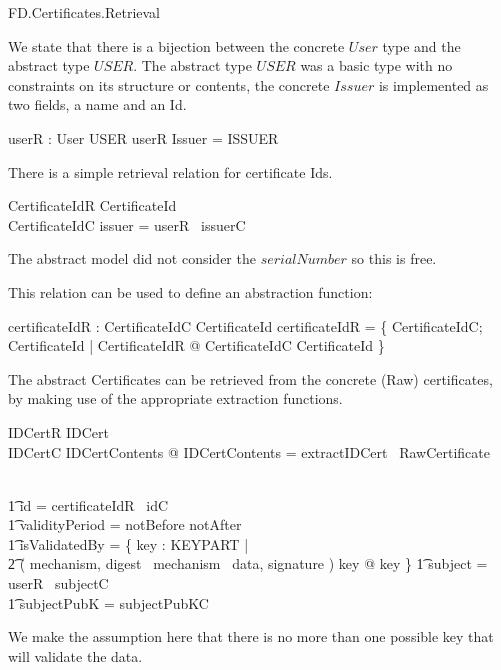 \begin{traceunit}{FD.Certificates.Retrieval}
\end{traceunit}

We state that there is a bijection between the concrete $User$ type
and the abstract type $USER$. The abstract type $USER$ was a basic
type with no constraints on its structure or contents, the concrete
$Issuer$ is implemented as two fields, a name and an Id.

\begin{axdef}
        userR : User \bij USER
\where
        userR \limg Issuer \rimg  = ISSUER
\end{axdef}


There is a simple retrieval relation for certificate Ids.

\begin{schema}{CertificateIdR}
        CertificateId
\\      CertificateIdC
\where
        issuer = userR~ issuerC
\end{schema}
\begin{Zcomment}
\item
The abstract model did not consider the $serialNumber$ so this is
free.
\end{Zcomment}

This relation can be used to define an abstraction function:

\begin{axdef}
        certificateIdR : CertificateIdC \fun
        CertificateId
\where
        certificateIdR = \{ CertificateIdC;
        CertificateId | CertificateIdR @ 
        \theta CertificateIdC \mapsto \theta CertificateId \} 
\end{axdef}

The abstract Certificates can be retrieved from the concrete (Raw)
certificates, by making use of the appropriate extraction functions. 

\begin{schema}{IDCertR}
        IDCert
\\      IDCertC
\where
        \exists IDCertContents @
        \theta IDCertContents = extractIDCert~ \theta RawCertificate

\\ \t1  \land id = certificateIdR~ idC
\\ \t1  \land validityPeriod = notBefore \upto notAfter
\\ \t1  \land isValidatedBy = \{ key : KEYPART | 
\\ \t2  ( mechanism,
digest~ mechanism~ data, signature ) \isVerifiedBy key @ key \}
\also 
   \t1  \land subject = userR~ subjectC
\\ \t1  \land subjectPubK = subjectPubKC
\end{schema}
\begin{Zcomment}
\item
We make the assumption here that there is no more than one possible key that
will validate the data. 
\end{Zcomment}


